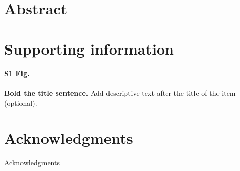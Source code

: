 \documentclass{article}
\begin{document}
\section*{Abstract}

\section*{Supporting information}

\paragraph*{S1 Fig.}
\label{S1_Fig}
{\bf Bold the title sentence.} Add descriptive text after the title of the item (optional).

\section*{Acknowledgments}
Acknowledgments



\end{document}
